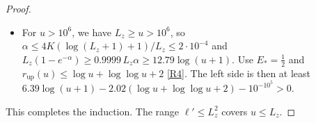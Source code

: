 \begin{proof}
\begin{itemize}
  $u\in[1,10^6]$: $13{,}823$ cells in ball arithmetic, no failures, minimum certified value $1.724$. On $u\in[1,2]$, the left
  side \emph{with} $X$ and $22e^{-0.4L_z}$, and even with an additional allowance $2K_Mr_{\mathrm{up}}(u)(e^{0.141}-1)$, is
  positive: $1{,}387$ cells, no failures, minimum certified value $0.829$.
\item For $u>10^6$, we have $L_z\ge u>10^6$, so $\alpha\le4K(\log(L_z+1)+1)/L_z\le2\cdot10^{-4}$ and
  $L_z(1-e^{-\alpha})\ge0.9999\,L_z\alpha\ge12.79\log(u+1)$. Use $E_*=\frac12$ and
  $r_{\mathrm{up}}(u)\le\log u+\log\log u+2$ \ref{R4}. The left side is then at least
  $6.39\log(u+1)-2.02(\log u+\log\log u+2)-10^{-10^5}>0$.
\end{itemize}
This completes the induction. The range $\ell'\le L_z^2$ covers $u\le L_z$.
\end{proof}
